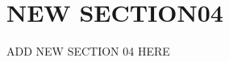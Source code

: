 \documentclass[../main.tex]{subfiles}
\begin{document}
\section{NEW SECTION04}
\label{sec:new_section_04}
ADD NEW SECTION 04 HERE
\end{document}

